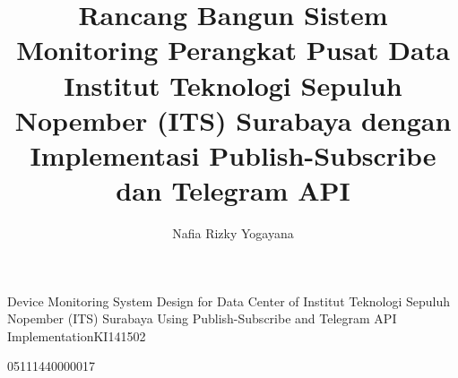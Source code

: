 \title{Rancang Bangun Sistem Monitoring Perangkat Pusat Data Institut Teknologi Sepuluh Nopember (ITS) Surabaya dengan Implementasi Publish-Subscribe dan Telegram API}{Device Monitoring System Design for Data Center of Institut Teknologi Sepuluh Nopember (ITS) Surabaya Using Publish-Subscribe and Telegram API Implementation}{KI141502}

\author{Nafia Rizky Yogayana}{05111440000017}



